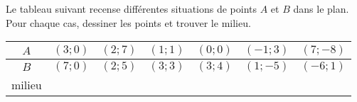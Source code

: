 
\begin{exercice}\label{exosmath-0021}

\begin{example}
    Le tableau suivant recense différentes situations de points \( A\) et \( B\) dans le plan. Pour chaque cas, dessiner les points et trouver le milieu.

    \begin{center}
        \begin{tabular}[h]{|c||c|c|c|c|c|c|}
            \hline
            \( A\)&\( (3;0)\)&\( (2;7)\)&\( (1;1)\)&\( (0;0)\)&\( (-1;3)\)&\( (7;-8)\)\\
            \hline
            \( B\)&\( (7;0)\)&\( (2;5)\)&\( (3;3)\)&\( (3;4)\)&\( (1;-5)\)&\( (-6;1)\)\\
            \hline\hline
            milieu&&&&&&\\
            \hline
        \end{tabular}
    \end{center}
\end{example}

\end{exercice}
